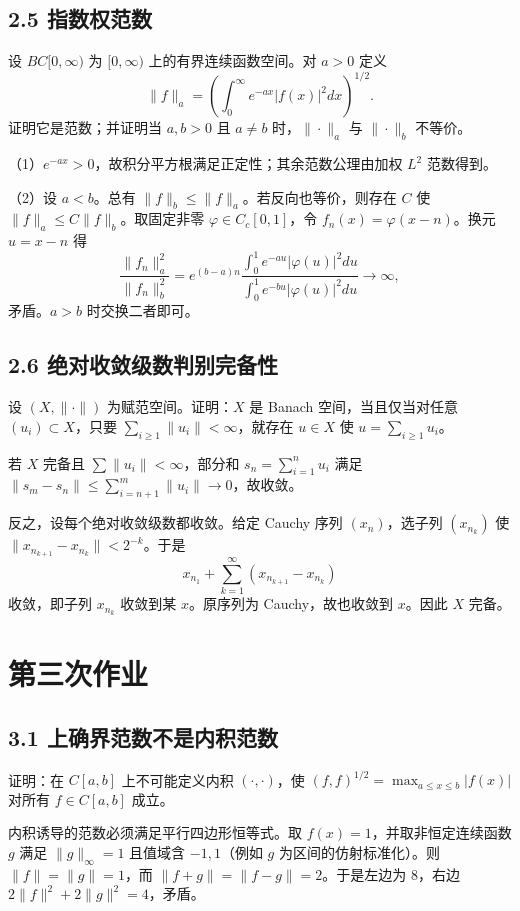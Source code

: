 \subsection*{2.5 指数权范数}
\begin{problem}
设 $BC[0,\infty)$ 为 $[0,\infty)$ 上的有界连续函数空间。对 $a>0$ 定义
\[
\|f\|_a=\left(\int_0^\infty e^{-ax}|f(x)|^2dx\right)^{1/2}.
\]
证明它是范数；并证明当 $a,b>0$ 且 $a\ne b$ 时，$\|\cdot\|_a$ 与 $\|\cdot\|_b$ 不等价。
\end{problem}
（1）$e^{-ax}>0$，故积分平方根满足正定性；其余范数公理由加权 $L^2$ 范数得到。

（2）设 $a<b$。总有 $\|f\|_b\le\|f\|_a$。若反向也等价，则存在 $C$ 使 $\|f\|_a\le C\|f\|_b$。取固定非零 $\varphi\in C_c[0,1]$，令 $f_n(x)=\varphi(x-n)$。换元 $u=x-n$ 得
\[
\frac{\|f_n\|_a^2}{\|f_n\|_b^2}
=e^{(b-a)n}\frac{\int_0^1e^{-au}|\varphi(u)|^2du}{\int_0^1e^{-bu}|\varphi(u)|^2du}\to\infty,
\]
矛盾。$a>b$ 时交换二者即可。

\subsection*{2.6 绝对收敛级数判别完备性}
\begin{problem}
设 $(X,\|\cdot\|)$ 为赋范空间。证明：$X$ 是 Banach 空间，当且仅当对任意 $(u_i)\subset X$，只要
$\sum_{i\ge1}\|u_i\|<\infty$，就存在 $u\in X$ 使 $u=\sum_{i\ge1}u_i$。
\end{problem}
若 $X$ 完备且 $\sum\|u_i\|<\infty$，部分和 $s_n=\sum_{i=1}^nu_i$ 满足
$\|s_m-s_n\|\le\sum_{i=n+1}^m\|u_i\|\to0$，故收敛。

反之，设每个绝对收敛级数都收敛。给定 Cauchy 序列 $(x_n)$，选子列 $(x_{n_k})$ 使
$\|x_{n_{k+1}}-x_{n_k}\|<2^{-k}$。于是
\[
x_{n_1}+\sum_{k=1}^\infty(x_{n_{k+1}}-x_{n_k})
\]
收敛，即子列 $x_{n_k}$ 收敛到某 $x$。原序列为 Cauchy，故也收敛到 $x$。因此 $X$ 完备。

\section{第三次作业}

\subsection*{3.1 上确界范数不是内积范数}
\begin{problem}
证明：在 $C[a,b]$ 上不可能定义内积 $(\cdot,\cdot)$，使
$(f,f)^{1/2}=\max_{a\le x\le b}|f(x)|$ 对所有 $f\in C[a,b]$ 成立。
\end{problem}
内积诱导的范数必须满足平行四边形恒等式。取 $f(x)=1$，并取非恒定连续函数 $g$ 满足 $\|g\|_\infty=1$ 且值域含 $-1,1$（例如 $g$ 为区间的仿射标准化）。则
$\|f\|=\|g\|=1$，而 $\|f+g\|=\|f-g\|=2$。于是左边为 $8$，右边 $2\|f\|^2+2\|g\|^2=4$，矛盾。

